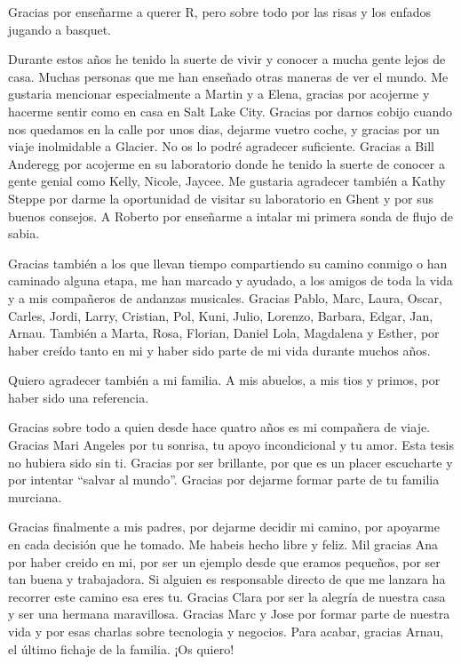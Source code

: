 \documentclass[11pt,twoside]{reedthesis}
\begin{document}
\begin{acknowledgements}
    Gracias por enseñarme a querer R, pero sobre todo por las risas y los
    enfados jugando a basquet.\par
    Durante estos años he tenido la suerte de vivir y conocer a mucha gente
    lejos de casa. Muchas personas que me han enseñado otras maneras de ver
    el mundo. Me gustaria mencionar especialmente a Martin y a Elena,
    gracias por acojerme y hacerme sentir como en casa en Salt Lake City.
    Gracias por darnos cobijo cuando nos quedamos en la calle por unos dias,
    dejarme vuetro coche, y gracias por un viaje inolmidable a Glacier. No
    os lo podré agradecer suficiente. Gracias a Bill Anderegg por acojerme
    en su laboratorio donde he tenido la suerte de conocer a gente genial
    como Kelly, Nicole, Jaycee. Me gustaria agradecer también a Kathy Steppe
    por darme la oportunidad de visitar su laboratorio en Ghent y por sus
    buenos consejos. A Roberto por enseñarme a intalar mi primera sonda de
    flujo de sabia.\par
    Gracias también a los que llevan tiempo compartiendo su camino conmigo o
    han caminado alguna etapa, me han marcado y ayudado, a los amigos de
    toda la vida y a mis compañeros de andanzas musicales. Gracias Pablo,
    Marc, Laura, Oscar, Carles, Jordi, Larry, Cristian, Pol, Kuni, Julio,
    Lorenzo, Barbara, Edgar, Jan, Arnau. También a Marta, Rosa, Florian,
    Daniel Lola, Magdalena y Esther, por haber creído tanto en mi y haber
    sido parte de mi vida durante muchos años.\par
    Quiero agradecer también a mi familia. A mis abuelos, a mis tios y
    primos, por haber sido una referencia.\par
    Gracias sobre todo a quien desde hace quatro años es mi compañera de
    viaje. Gracias Mari Angeles por tu sonrisa, tu apoyo incondicional y tu
    amor. Esta tesis no hubiera sido sin ti. Gracias por ser brillante, por
    que es un placer escucharte y por intentar ``salvar al mundo''. Gracias
    por dejarme formar parte de tu familia murciana.\par
    Gracias finalmente a mis padres, por dejarme decidir mi camino, por
    apoyarme en cada decisión que he tomado. Me habeis hecho libre y feliz.
    Mil gracias Ana por haber creido en mi, por ser un ejemplo desde que
    eramos pequeños, por ser tan buena y trabajadora. Si alguien es
    responsable directo de que me lanzara ha recorrer este camino esa eres
    tu. Gracias Clara por ser la alegría de nuestra casa y ser una hermana
    maravillosa. Gracias Marc y Jose por formar parte de nuestra vida y por
    esas charlas sobre tecnologia y negocios. Para acabar, gracias Arnau, el
    último fichaje de la familia. ¡Os quiero!\par
  \end{acknowledgements}
\end{document}
